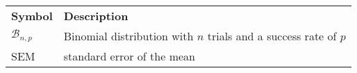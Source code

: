 


% 
% 

\begin{longtable}[l]{p{75pt} p{200pt}} 
\textbf{Symbol}	&  \textbf{Description} \\ 

$\mathcal{B}_{n,p}$  & Binomial distribution with $n$ trials and a
                       success rate of $p$ \\
SEM                  & standard error of the mean 

\end{longtable}




